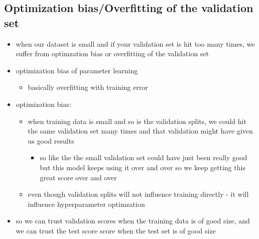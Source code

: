 \documentclass[10.5pt,a4paper, fleqn, dvipsnames]{article}
\begin{document}
\subsection*{Optimization bias/Overfitting of the validation set}
\begin{itemize}
    \item when our dataset is small and if your validation set is hit too many times, we suffer from optimzation bias or overfitting of the validation set 
    \item optimization bias of parameter learning 
    \begin{itemize}
        \item basically overfitting with training error
    \end{itemize}
    \item optimization bias:
    \begin{itemize}
        \item when training data is small and so is the validation splits, we could hit the same validation set many times and that validation might have given us good results 
        \begin{itemize}[leftmargin = 2em]
            \item so like the the small validation set could have just been really good but this model keeps using it over and over so we keep getting this great score over and over
        \end{itemize}
        \item even though validation splits will not influence training directly - it will influence hyperparameter optimzation
    \end{itemize}
    \item so we can trust validation scores when the training data is of good size, and we can trust the test score score when the test set is of good size 
\end{itemize}
\end{document}
